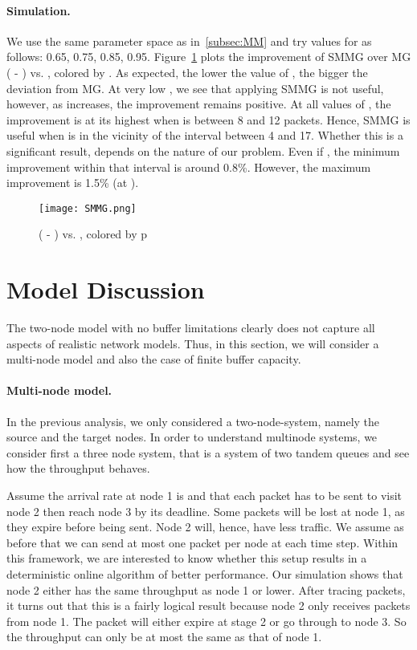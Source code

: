 \documentclass[oribibl]{llncs}
\begin{document}
\paragraph{Simulation.} We use the same parameter space as in~\ref{subsec:MM} and try values for  as follows: 0.65, 0.75, 0.85, 0.95. Figure~\ref{fig:SMMG} plots the improvement of SMMG over MG ( - ) vs. , colored by .  As expected, the lower the value of , the bigger the deviation from MG. At very low , we see that applying SMMG is not useful, however, as  increases, the improvement remains positive. At all values of , the improvement is at its highest when  is between 8 and 12 packets. Hence, SMMG is useful when  is in the vicinity of the interval between 4 and 17. Whether this is a significant result, depends on the nature of our problem. Even if , the minimum improvement within that interval is around 0.8\%. However, the maximum improvement is 1.5\% (at ). 

\begin{figure}[ht]\centering 
\texttt{[image: SMMG.png]}
\caption{( - ) vs. , colored by p}
\label{fig:SMMG}
\end{figure}

\vspace{-24pt}
\section {Model Discussion}
\label{sec:MD}


The two-node model with no buffer limitations clearly does not capture all aspects of 
realistic network models.  Thus, in this section, we will consider a
multi-node model and also the case of finite buffer capacity.



\paragraph{Multi-node model.} In the previous analysis, we only
considered a two-node-system, namely the source and the target
nodes.  In order to understand multinode systems, we consider first 
a three node system, that is a
system of two tandem  queues and see how the throughput behaves.

Assume the arrival rate at node 1 is  and that each packet
has to be sent to visit node 2 then reach node 3 by its deadline. Some
packets will be lost at node 1, as they expire before being sent. Node
2 will, hence, have less traffic. We assume as before that we can send
at most one packet per node at each time step. Within this framework,
we are interested to know whether this setup results in a
deterministic online algorithm of better performance. Our simulation
shows that node 2 either has the same throughput as node 1 or
lower. After tracing packets, it turns out that this is a fairly
logical result because node 2 only receives packets from node 1. The
packet will either expire at stage 2 or go through to node 3. So the
throughput can only be at most the same as that of node 1.
\end{document}
